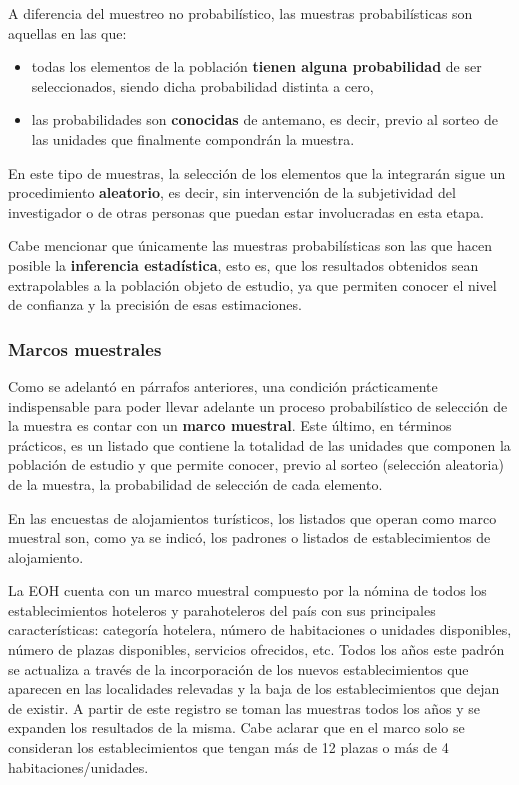 \documentclass[
]{book}
\begin{document}
A diferencia del muestreo no probabilístico, las muestras probabilísticas son aquellas en las que:

\begin{itemize}
\item
  todas los elementos de la población \textbf{tienen alguna probabilidad} de ser seleccionados, siendo dicha probabilidad distinta a cero,
\item
  las probabilidades son \textbf{conocidas} de antemano, es decir, previo al sorteo de las unidades que finalmente compondrán la muestra.
\end{itemize}

En este tipo de muestras, la selección de los elementos que la integrarán sigue un procedimiento \textbf{aleatorio}, es decir, sin intervención de la subjetividad del investigador o de otras personas que puedan estar involucradas en esta etapa.

Cabe mencionar que únicamente las muestras probabilísticas son las que hacen posible la \textbf{inferencia estadística}, esto es, que los resultados obtenidos sean extrapolables a la población objeto de estudio, ya que permiten conocer el nivel de confianza y la precisión de esas estimaciones.

\hypertarget{marcos-muestrales}{%
\subsubsection{Marcos muestrales}\label{marcos-muestrales}}

Como se adelantó en párrafos anteriores, una condición prácticamente indispensable para poder llevar adelante un proceso probabilístico de selección de la muestra es contar con un \textbf{marco muestral}. Este último, en términos prácticos, es un listado que contiene la totalidad de las unidades que componen la población de estudio y que permite conocer, previo al sorteo (selección aleatoria) de la muestra, la probabilidad de selección de cada elemento.

En las encuestas de alojamientos turísticos, los listados que operan como marco muestral son, como ya se indicó, los padrones o listados de establecimientos de alojamiento.

La EOH cuenta con un marco muestral compuesto por la nómina de todos los establecimientos hoteleros y parahoteleros del país con sus principales características: categoría hotelera, número de habitaciones o unidades disponibles, número de plazas disponibles, servicios ofrecidos, etc. Todos los años este padrón se actualiza a través de la incorporación de los nuevos establecimientos que aparecen en las localidades relevadas y la baja de los establecimientos que dejan de existir. A partir de este registro se toman las muestras todos los años y se expanden los resultados de la misma. Cabe aclarar que en el marco solo se consideran los establecimientos que tengan más de 12 plazas o más de 4 habitaciones/unidades.
\end{document}

